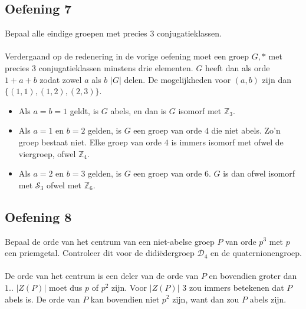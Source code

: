 \documentclass[main.tex]{subfiles}
\begin{document}
\subsection*{Oefening 7}
\label{sec:oz3-oef6}
Bepaal alle eindige groepen met precies $3$ conjugatieklassen.\\\\
Verdergaand op de redenering in de vorige oefening moet een groep $G,*$ met precies $3$ conjugatieklassen minstens drie elementen.
$G$ heeft dan als orde $1+a+b$ zodat zowel $a$ als $b$ $|G|$ delen.
De mogelijkheden voor $(a,b)$ zijn dan $\{(1,1),(1,2),(2,3)\}$.
\begin{itemize}
\item Als $a = b = 1$ geldt, is $G$ abels, en dan is $G$ isomorf met $\mathbb{Z}_{3}$.
\item Als $a=1$ en $b=2$ gelden, is $G$ een groep van orde $4$ die niet abels. Zo'n groep bestaat niet.
  Elke groep van orde $4$ is immers isomorf met ofwel de viergroep, ofwel $\mathbb{Z}_{4}$.
\item Als $a=2$ en $b=3$ gelden, is $G$ een groep van orde $6$. $G$ is dan ofwel isomorf met $\mathcal{S}_{3}$ ofwel met $\mathbb{Z}_{6}$.
\end{itemize}

\subsection*{Oefening 8}
\label{sec:oz3-oef7}
Bepaal de orde van het centrum van een niet-abelse groep $P$ van orde $p^{3}$ met $p$ een priemgetal.
Controleer dit voor de didi\"edergroep $\mathcal{D}_{4}$ en de quaternionengroep.\\\\
De orde van het centrum is een deler van de orde van $P$  en bovendien groter dan $1$..
$|Z(P)|$ moet dus $p$ of $p^{2}$ zijn.
Voor $|Z(P)|$ $3$ zou immers betekenen dat $P$ abels is.
De orde van $P$ kan bovendien niet $p^{2}$ zijn, want dan zou $P$ abels zijn.
\end{document}
